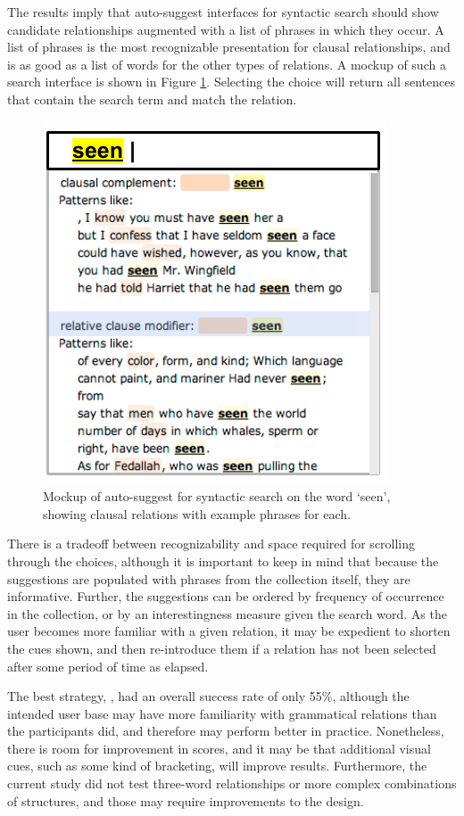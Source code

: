 

The results imply that auto-suggest interfaces for syntactic search should show candidate relationships augmented with a list of phrases in which they occur. A list of phrases is the most recognizable presentation for clausal relationships, and is as good as a list of words for the other types of relations. A mockup of such a search interface is shown in Figure \ref{fig:phrases-mockup}.  Selecting the choice will return all sentences that contain the search term and match the relation.
\begin{figure}
\centering
\includegraphics[width=0.5\columnwidth]{fig/phrases-mockup}
\caption{
	\label{fig:phrases-mockup} Mockup of auto-suggest for syntactic search on the word `seen', showing clausal relations with example phrases for each.
}
\end{figure}

There is a tradeoff between recognizability and space required for scrolling through the choices, although it is important to keep in mind that because the suggestions are populated with phrases from the collection itself, they are informative.    Further, the suggestions can be ordered by frequency of occurrence in the collection, or by an interestingness measure given the search word.  As the user becomes more familiar with a given relation, it may  be expedient to shorten the cues shown, and then re-introduce them if a relation has not been selected after some period of time as elapsed.

The best  strategy, , had an overall success rate of only 55\%, although the intended user base may have more familiarity with grammatical relations than the participants did, and therefore may perform better in practice.  Nonetheless, there is room for improvement in scores, and it may be that additional visual cues, such as some kind of bracketing, will improve results.  Furthermore, the current study did not test three-word relationships or more complex combinations of structures, and those may require improvements to the design.
